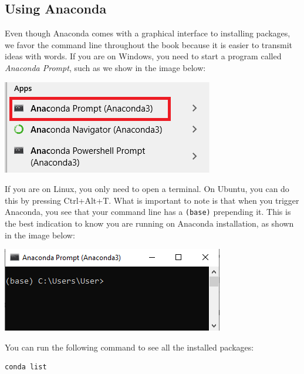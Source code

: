 
\subsection{Using Anaconda}\label{subsec:using-anaconda}
Even though Anaconda comes with a graphical interface to installing packages, we favor the command line throughout the book because it is easier to transmit ideas with words. If you are on Windows, you need to start a program called \emph{Anaconda Prompt}, such as we show in the image below:

\begin{center}
\includegraphics[width=.5\textwidth]{images/Chapter_02/AnacondaPrompt_Menu.png}
\end{center}

If you are on Linux, you only need to open a terminal. On Ubuntu, you can do this by pressing Ctrl+Alt+T. What is important to note is that when you trigger Anaconda, you see that your command line has a \texttt{(base)} prepending it. This is the best indication to know you are running on Anaconda installation, as shown in the image below:

\begin{center}
\includegraphics[width=.5\textwidth]{images/Chapter_02/AnacondaPrompt.png}
\end{center}

You can run the following command to see all the installed packages:

\begin{verbatim}
conda list
\end{verbatim}

